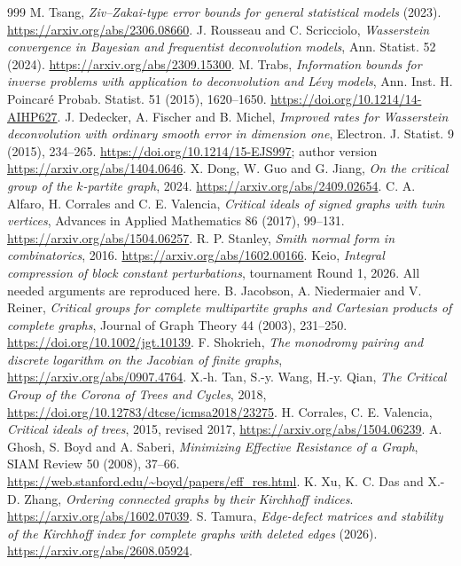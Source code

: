\documentclass[11pt,a4paper]{article}
\theoremstyle{definition}\newtheorem{definition}[theorem]{Definition}
\theoremstyle{remark}\newtheorem{remark}[theorem]{Remark}
\numberwithin{equation}{section}
\begin{document}
\begin{thebibliography}{999}
 M. Tsang, \emph{Ziv--Zakai-type error bounds for general statistical models} (2023). \url{https://arxiv.org/abs/2306.08660}.
 J. Rousseau and C. Scricciolo, \emph{Wasserstein convergence in Bayesian and frequentist deconvolution models}, Ann. Statist. 52 (2024). \url{https://arxiv.org/abs/2309.15300}.
 M. Trabs, \emph{Information bounds for inverse problems with application to deconvolution and L\'evy models}, Ann. Inst. H. Poincar\'e Probab. Statist. 51 (2015), 1620--1650. \url{https://doi.org/10.1214/14-AIHP627}.
 J. Dedecker, A. Fischer and B. Michel, \emph{Improved rates for Wasserstein deconvolution with ordinary smooth error in dimension one}, Electron. J. Statist. 9 (2015), 234--265. \url{https://doi.org/10.1214/15-EJS997}; author version \url{https://arxiv.org/abs/1404.0646}.
 X. Dong, W. Guo and G. Jiang, \emph{On the critical group of the $k$-partite graph}, 2024. \url{https://arxiv.org/abs/2409.02654}.
 C. A. Alfaro, H. Corrales and C. E. Valencia, \emph{Critical ideals of signed graphs with twin vertices}, Advances in Applied Mathematics 86 (2017), 99--131. \url{https://arxiv.org/abs/1504.06257}.
 R. P. Stanley, \emph{Smith normal form in combinatorics}, 2016. \url{https://arxiv.org/abs/1602.00166}.
 Keio, \emph{Integral compression of block constant perturbations}, tournament Round 1, 2026. All needed arguments are reproduced here.
 B. Jacobson, A. Niedermaier and V. Reiner, \emph{Critical groups for complete multipartite graphs and Cartesian products of complete graphs}, Journal of Graph Theory 44 (2003), 231--250. \url{https://doi.org/10.1002/jgt.10139}.
 F. Shokrieh, \emph{The monodromy pairing and discrete logarithm on the Jacobian of finite graphs}, \url{https://arxiv.org/abs/0907.4764}.
 X.-h. Tan, S.-y. Wang, H.-y. Qian, \emph{The Critical Group of the Corona of Trees and Cycles}, 2018, \url{https://doi.org/10.12783/dtcse/icmsa2018/23275}.
 H. Corrales, C. E. Valencia, \emph{Critical ideals of trees}, 2015, revised 2017, \url{https://arxiv.org/abs/1504.06239}.
 A. Ghosh, S. Boyd and A. Saberi, \emph{Minimizing Effective Resistance of a Graph}, SIAM Review 50 (2008), 37--66. \url{https://web.stanford.edu/~boyd/papers/eff_res.html}.
 K. Xu, K. C. Das and X.-D. Zhang, \emph{Ordering connected graphs by their Kirchhoff indices}. \url{https://arxiv.org/abs/1602.07039}.
 S. Tamura, \emph{Edge-defect matrices and stability of the Kirchhoff index for complete graphs with deleted edges} (2026). \url{https://arxiv.org/abs/2608.05924}.

\end{thebibliography}
\end{document}

